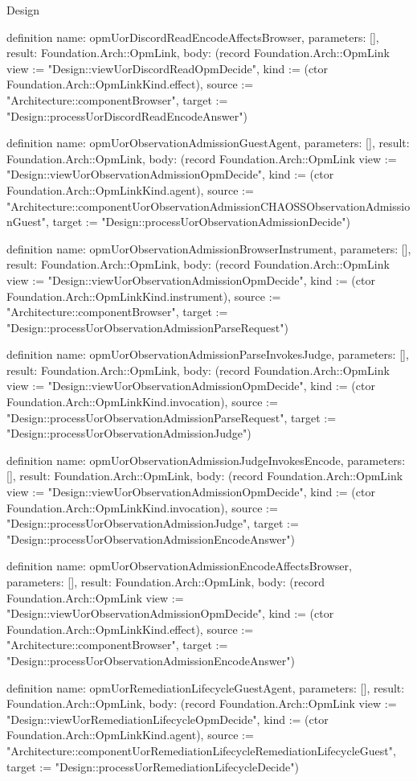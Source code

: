 \begin{lexlean}{Design}
\begin{semanticmodule}
definition{
  name: opmUorDiscordReadEncodeAffectsBrowser,
  parameters: [],
  result: Foundation.Arch::OpmLink,
  body: (record Foundation.Arch::OpmLink {view := "Design::viewUorDiscordReadOpmDecide", kind := (ctor Foundation.Arch::OpmLinkKind.effect), source := "Architecture::componentBrowser", target := "Design::processUorDiscordReadEncodeAnswer"})
}

definition{
  name: opmUorObservationAdmissionGuestAgent,
  parameters: [],
  result: Foundation.Arch::OpmLink,
  body: (record Foundation.Arch::OpmLink {view := "Design::viewUorObservationAdmissionOpmDecide", kind := (ctor Foundation.Arch::OpmLinkKind.agent), source := "Architecture::componentUorObservationAdmissionCHAOSSObservationAdmissionGuest", target := "Design::processUorObservationAdmissionDecide"})
}

definition{
  name: opmUorObservationAdmissionBrowserInstrument,
  parameters: [],
  result: Foundation.Arch::OpmLink,
  body: (record Foundation.Arch::OpmLink {view := "Design::viewUorObservationAdmissionOpmDecide", kind := (ctor Foundation.Arch::OpmLinkKind.instrument), source := "Architecture::componentBrowser", target := "Design::processUorObservationAdmissionParseRequest"})
}

definition{
  name: opmUorObservationAdmissionParseInvokesJudge,
  parameters: [],
  result: Foundation.Arch::OpmLink,
  body: (record Foundation.Arch::OpmLink {view := "Design::viewUorObservationAdmissionOpmDecide", kind := (ctor Foundation.Arch::OpmLinkKind.invocation), source := "Design::processUorObservationAdmissionParseRequest", target := "Design::processUorObservationAdmissionJudge"})
}

definition{
  name: opmUorObservationAdmissionJudgeInvokesEncode,
  parameters: [],
  result: Foundation.Arch::OpmLink,
  body: (record Foundation.Arch::OpmLink {view := "Design::viewUorObservationAdmissionOpmDecide", kind := (ctor Foundation.Arch::OpmLinkKind.invocation), source := "Design::processUorObservationAdmissionJudge", target := "Design::processUorObservationAdmissionEncodeAnswer"})
}

definition{
  name: opmUorObservationAdmissionEncodeAffectsBrowser,
  parameters: [],
  result: Foundation.Arch::OpmLink,
  body: (record Foundation.Arch::OpmLink {view := "Design::viewUorObservationAdmissionOpmDecide", kind := (ctor Foundation.Arch::OpmLinkKind.effect), source := "Architecture::componentBrowser", target := "Design::processUorObservationAdmissionEncodeAnswer"})
}

definition{
  name: opmUorRemediationLifecycleGuestAgent,
  parameters: [],
  result: Foundation.Arch::OpmLink,
  body: (record Foundation.Arch::OpmLink {view := "Design::viewUorRemediationLifecycleOpmDecide", kind := (ctor Foundation.Arch::OpmLinkKind.agent), source := "Architecture::componentUorRemediationLifecycleRemediationLifecycleGuest", target := "Design::processUorRemediationLifecycleDecide"})
}


\end{semanticmodule}
\end{lexlean}
